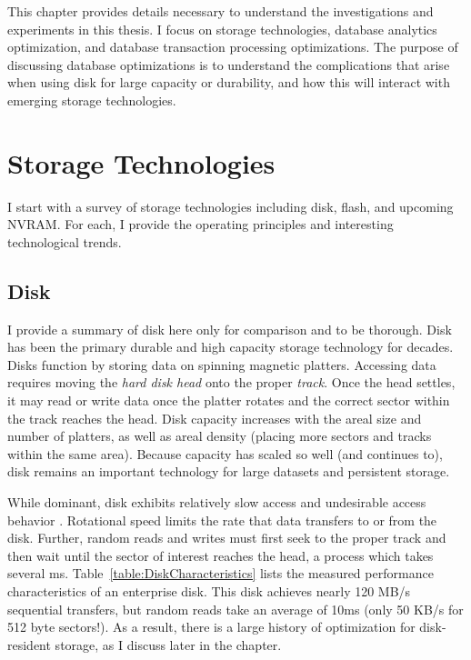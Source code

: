 This chapter provides details necessary to understand the investigations and experiments in this thesis.
I focus on storage technologies, database analytics optimization, and database transaction processing optimizations.
The purpose of discussing database optimizations is to understand the complications that arise when using disk for large capacity or durability, and how this will interact with emerging storage technologies.

\section{Storage Technologies}
\label{sec:Background:Storage}

I start with a survey of storage technologies including disk, flash, and upcoming NVRAM.
For each, I provide the operating principles and interesting technological trends.



\subsection{Disk}
\label{sec:Background:Storage:Disk}
I provide a summary of disk here only for comparison and to be thorough.
Disk has been the primary durable and high capacity storage technology for decades.
Disks function by storing data on spinning magnetic platters.
Accessing data requires moving the \emph{hard disk head} onto the proper \emph{track}.
Once the head settles, it may read or write data once the platter rotates and the correct sector within the track reaches the head.
Disk capacity increases with the areal size and number of platters, as well as areal density (placing more sectors and tracks within the same area).
Because capacity has scaled so well (and continues to), disk remains an important technology for large datasets and persistent storage.

While dominant, disk exhibits relatively slow access and undesirable access behavior \cite{RuemmlerWilkes94}.
Rotational speed limits the rate that data transfers to or from the disk.
Further, random reads and writes must first seek to the proper track and then wait until the sector of interest reaches the head, a process which takes several ms.
Table~\ref{table:DiskCharacteristics} lists the measured performance characteristics of an enterprise disk.
This disk achieves nearly 120 MB/s sequential transfers, but random reads take an average of 10ms (only 50 KB/s for 512 byte sectors!).
As a result, there is a large history of optimization for disk-resident storage, as I discuss later in the chapter.

